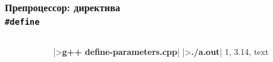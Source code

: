 \documentclass[compress]{beamer}
\newcommand{\shellprompt}{>}
\newcommand{\shellcommand}[1]{\shellprompt \space \textbf{#1}}
\begin{document}
\begin{frame}[fragile]

    \frametitle{Препроцессор: директива \\ \texttt{\#define}}

    \begin{columns}[T]

        \begin{column}{0.5\textwidth}


        \end{column}

        \begin{column}{0.5\textwidth}

            \begin{ConsoleWindow}[\scriptsize]
|\shellcommand{g++ define-parameters.cpp}|
|\shellcommand{./a.out}|
1, 3.14, text
            \end{ConsoleWindow}

        \end{column}

    \end{columns}

\end{frame}
\end{document}
